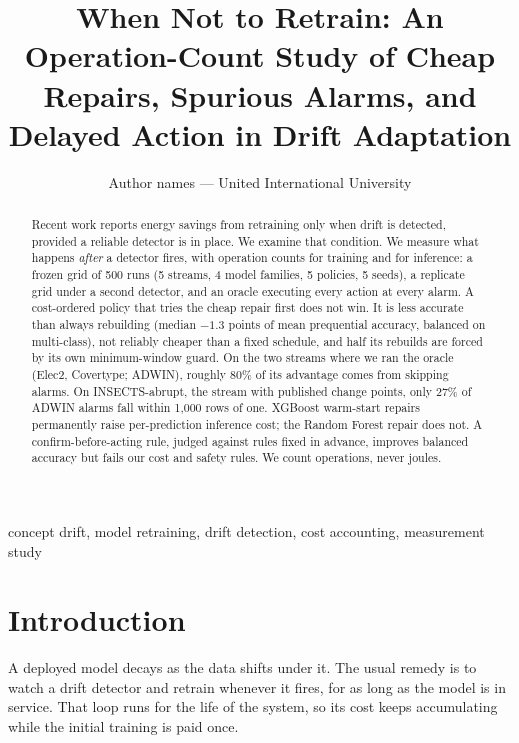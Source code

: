 \documentclass[conference]{IEEEtran}
\begin{document}
\title{When Not to Retrain: An Operation-Count Study of Cheap Repairs,
Spurious Alarms, and Delayed Action in Drift Adaptation}

\author{Author names --- United International University}

\maketitle

\begin{abstract}
Recent work reports energy savings from retraining only when drift is detected,
provided a reliable detector is in place. We examine that condition.
We measure what happens \emph{after} a detector fires, with
operation counts for training and for inference: a frozen
grid of 500 runs (5 streams, 4 model families, 5 policies, 5 seeds), a replicate
grid under a second detector, and an oracle executing every action at every alarm. A cost-ordered policy that tries the cheap repair
first does not win. It is less accurate than always rebuilding (median $-1.3$
points of mean prequential accuracy, balanced on multi-class), not reliably
cheaper than a fixed schedule, and half its rebuilds are forced by its own
minimum-window guard. On the two streams where we ran the oracle (Elec2,
Covertype; ADWIN), roughly 80\% of its advantage comes from skipping alarms. On
INSECTS-abrupt, the stream with published change points, only 27\% of ADWIN
alarms fall within 1{,}000 rows of one. XGBoost warm-start repairs permanently
raise per-prediction inference cost; the Random Forest repair does not. A
confirm-before-acting rule, judged against rules fixed in advance, improves
balanced accuracy but fails our cost and safety rules. We count operations, never joules.
\end{abstract}

\begin{IEEEkeywords}
concept drift, model retraining, drift detection, cost accounting, measurement study
\end{IEEEkeywords}

\section{Introduction}

A deployed model decays as the data shifts under it. The usual remedy is to watch
a drift detector and retrain whenever it fires, for as long as the model is in
service. That loop runs for the life of the system, so its cost keeps
accumulating while the initial training is paid once.
\end{document}
